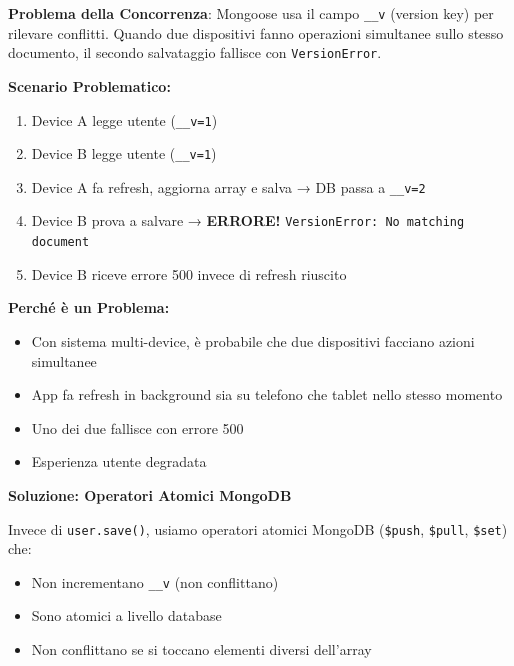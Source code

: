 \documentclass[11pt,a4paper]{article}
\newcommand{\code}[1]{\texttt{#1}}
\newcommand{\important}[1]{\textcolor{red!80!black}{\textbf{#1}}}
\begin{document}
\important{Problema della Concorrenza}: Mongoose usa il campo \code{__v} (version key) per rilevare conflitti. Quando due dispositivi fanno operazioni simultanee sullo stesso documento, il secondo salvataggio fallisce con \code{VersionError}.

\textbf{Scenario Problematico:}
\begin{enumerate}
    \item Device A legge utente (\code{__v=1})
    \item Device B legge utente (\code{__v=1})
    \item Device A fa refresh, aggiorna array e salva → DB passa a \code{__v=2}
    \item Device B prova a salvare → \important{ERRORE!} \code{VersionError: No matching document}
    \item Device B riceve errore 500 invece di refresh riuscito
\end{enumerate}

\textbf{Perché è un Problema:}
\begin{itemize}
    \item Con sistema multi-device, è probabile che due dispositivi facciano azioni simultanee
    \item App fa refresh in background sia su telefono che tablet nello stesso momento
    \item Uno dei due fallisce con errore 500
    \item Esperienza utente degradata
\end{itemize}

\textbf{Soluzione: Operatori Atomici MongoDB}

Invece di \code{user.save()}, usiamo operatori atomici MongoDB (\code{\$push}, \code{\$pull}, \code{\$set}) che:
\begin{itemize}
    \item Non incrementano \code{__v} (non conflittano)
    \item Sono atomici a livello database
    \item Non conflittano se si toccano elementi diversi dell'array
\end{itemize}
\end{document}
